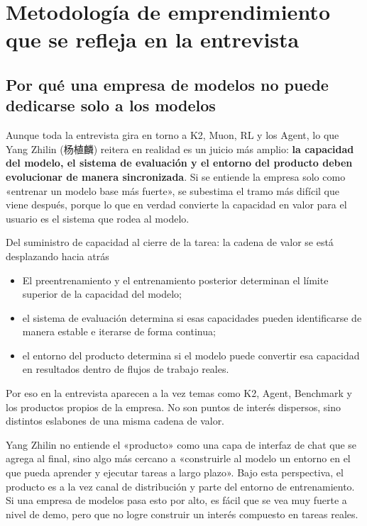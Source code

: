 \documentclass[a4paper]{article}
\begin{document}
\section{Metodología de emprendimiento que se refleja en la entrevista}

\subsection{Por qué una empresa de modelos no puede dedicarse solo a los modelos}
Aunque toda la entrevista gira en torno a K2, Muon, RL y los Agent, lo que Yang Zhilin (杨植麟) reitera en realidad es un juicio más amplio: \textbf{la capacidad del modelo, el sistema de evaluación y el entorno del producto deben evolucionar de manera sincronizada}. Si se entiende la empresa solo como «entrenar un modelo base más fuerte», se subestima el tramo más difícil que viene después, porque lo que en verdad convierte la capacidad en valor para el usuario es el sistema que rodea al modelo.

\begin{importantbox}{Del suministro de capacidad al cierre de la tarea: la cadena de valor se está desplazando hacia atrás}
\begin{itemize}
    \item El preentrenamiento y el entrenamiento posterior determinan el límite superior de la capacidad del modelo;
    \item el sistema de evaluación determina si esas capacidades pueden identificarse de manera estable e iterarse de forma continua;
    \item el entorno del producto determina si el modelo puede convertir esa capacidad en resultados dentro de flujos de trabajo reales.
\end{itemize}
Por eso en la entrevista aparecen a la vez temas como K2, Agent, Benchmark y los productos propios de la empresa. No son puntos de interés dispersos, sino distintos eslabones de una misma cadena de valor.
\end{importantbox}

Yang Zhilin no entiende el «producto» como una capa de interfaz de chat que se agrega al final, sino algo más cercano a «construirle al modelo un entorno en el que pueda aprender y ejecutar tareas a largo plazo». Bajo esta perspectiva, el producto es a la vez canal de distribución y parte del entorno de entrenamiento. Si una empresa de modelos pasa esto por alto, es fácil que se vea muy fuerte a nivel de demo, pero que no logre construir un interés compuesto en tareas reales.
\end{document}
